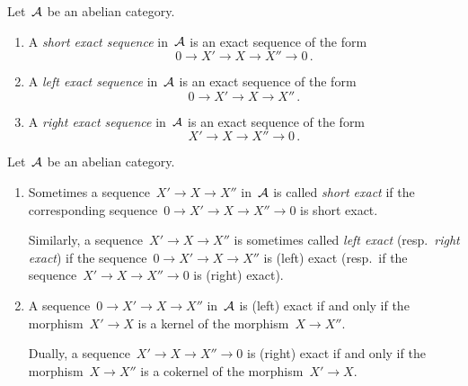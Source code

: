 \begin{definition*}
  Let~$\mathcal{A}$ be an abelian category.
  \begin{enumerate}
    \item
      A \emph{short exact sequence} in~$\mathcal{A}$ is an exact sequence of the form
      \[
            0
        \to X'
        \to X
        \to X''
        \to 0 \,.
      \]
    \item
      A \emph{left exact sequence} in~$\mathcal{A}$ is an exact sequence of the form
      \[
            0
        \to X'
        \to X
        \to X'' \,.
      \]
    \item
      A \emph{right exact sequence} in~$\mathcal{A}$ is an exact sequence of the form
      \[
            X'
        \to X
        \to X''
        \to 0 \,.
      \]
  \end{enumerate}
\end{definition*}


\begin{remark*}
  \label{language of left and right exact}
  Let~$\mathcal{A}$ be an abelian category.
  \begin{enumerate}
    \item
      Sometimes a sequence~$X' \to X \to X''$ in~$\mathcal{A}$ is called \emph{short exact} if the corresponding sequence~$0 \to X' \to X \to X'' \to 0$ is short exact.
      
      Similarly, a sequence~$X' \to X \to X''$ is sometimes called \emph{left exact} (resp.\ \emph{right exact}) if the sequence~$0 \to X' \to X \to X''$ is (left) exact (resp.\ if the sequence~$X' \to X \to X'' \to 0$ is (right) exact).
    \item
      A sequence~$0 \to X' \to X \to X''$ in~$\mathcal{A}$ is (left) exact if and only if the morphism~$X' \to X$ is a kernel of the morphism~$X \to X''$.
      
      Dually, a sequence~$X' \to X \to X'' \to 0$ is (right) exact if and only if the morphism~$X \to X''$ is a cokernel of the morphism~$X' \to X$.
  \end{enumerate}
\end{remark*}


